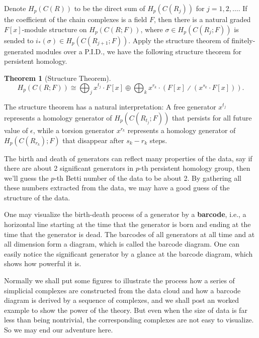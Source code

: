 \documentclass{assignment}[2019/10/15]
\theoremstyle{plain}
\newtheorem{theorem}{Theorem}
\renewcommand{\emph}[1]{\textbf{#1}}
\newcommand{\DIV}{{\divslash}}
\begin{document}
  Denote $H_p(C(R))$ to be the direct sum of $H_p(C(R_j))$ for $j=1, 2, \dotsc$. If the coefficient of the chain complexes is a field $F$, then there is a natural graded $F[x]$-module structure on $H_p(C(R; F))$, where $\sigma\in H_p(C(R_j; F))$ is sended to $i_*(\sigma)\in H_p(C(R_{j+1}; F))$. Apply the structure theorem of finitely-generated modules over a P.I.D., we have the following structure theorem for persistent homology.

  \begin{theorem}[Structure Theorem]
    \begin{equation*}
      H_p(C(R; F))\cong \bigoplus_{j}x^{t_j}\cdot F[x]\oplus\bigoplus_kx^{r_k}\cdot (F[x]\DIV (x^{s_k}\cdot F[x])).
    \end{equation*}
  \end{theorem}

  The structure theorem has a natural interpretation: A free generator $x^{t_j}$ represents a homology generator of $H_p(C(R_{t_j}; F))$ that persists for all future value of $\epsilon$, while a torsion generator $x^{r_k}$ represents a homology generator of $H_p(C(R_{r_k}); F)$ that disappear after $s_k-r_k$ steps.

  The birth and death of generators can reflect many properties of the data, say if there are about 2 significant generators in $p$-th persistent homology group, then we'll guess the $p$-th Betti number of the data to be about 2. By gathering all these numbers extracted from the data, we may have a good guess of the structure of the data.

  One may visualize the birth-death process of a generator by a \emph{barcode}, i.e., a horizontal line starting at the time that the generator is born and ending at the time that the generator is dead. The barcodes of all generators at all time and at all dimension form a diagram, which is called the barcode diagram. One can easily notice the significant generator by a glance at the barcode diagram, which shows how powerful it is.

  Normally we shall put some figures to illustrate the process how a series of simplicial complexes are constructed from the data cloud and how a barcode diagram is derived by a sequence of complexes, and we shall post an worked example to show the power of the theory. But even when the size of data is far less than being nontrivial, the corresponding complexes are not easy to visualize. So we may end our adventure here.
\end{document}
